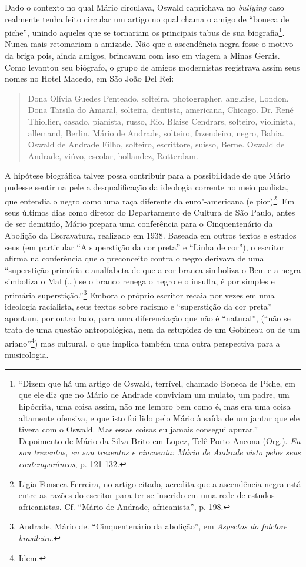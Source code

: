 Dado o contexto no qual Mário circulava, Oswald caprichava no
\emph{bullying} caso realmente tenha feito circular um artigo no qual
chama o amigo de ``boneca de piche'', unindo aqueles que se tornariam os
principais tabus de sua biografia\footnote{``Dizem que há um artigo de
  Oswald, terrível, chamado Boneca de Piche, em que ele diz que no Mário
  de Andrade conviviam um mulato, um padre, um hipócrita, uma coisa
  assim, não me lembro bem como é, mas era uma coisa altamente ofensiva,
  e que isto foi lido pelo Mário à saída de um jantar que ele tivera com
  o Oswald. Mas essas coisas eu jamais consegui apurar.'' Depoimento de
  Mário da Silva Brito em Lopez, Telê Porto Ancona (Org.). \emph{Eu sou
  trezentos, eu sou trezentos e cincoenta: Mário de Andrade visto pelos
  seus contemporâneos}, p. 121-132.}. Nunca mais retomariam a amizade.
Não que a ascendência negra fosse o motivo da briga pois, ainda amigos,
brincavam com isso em viagem a Minas Gerais. Como levantou seu biógrafo,
o grupo de amigos modernistas registrava assim seus nomes no Hotel
Macedo, em São João Del Rei:

\begin{quote}
Dona Olívia Guedes Penteado, solteira, photographer, anglaise, London.
Dona Tarsila do Amaral, solteira, dentista, americana, Chicago. Dr. René
Thiollier, casado, pianista, russo, Rio. Blaise Cendrars, solteiro,
violinista, allemand, Berlin. Mário de Andrade, solteiro, fazendeiro,
negro, Bahia. Oswald de Andrade Filho, solteiro, escrittore, suisso,
Berne. Oswald de Andrade, viúvo, escolar, hollandez, Rotterdam.
\end{quote}

A hipótese biográfica talvez possa contribuir para a possibilidade de
que Mário pudesse sentir na pele a desqualificação da ideologia corrente
no meio paulista, que entendia o negro como uma raça diferente da
euro"-americana (e pior)\footnote{Ligia Fonseca Ferreira, no artigo
  citado, acredita que a ascendência negra está entre as razões do
  escritor para ter se inserido em uma rede de estudos africanistas. Cf.
  ``Mário de Andrade, africanista'', p. 198.}. Em seus últimos dias como
diretor do Departamento de Cultura de São Paulo, antes de ser demitido,
Mário prepara uma conferência para o Cinquentenário da Abolição da
Escravatura, realizado em 1938. Baseada em outros textos e estudos seus
(em particular ``A superstição da cor preta'' e ``Linha de cor''), o
escritor afirma na conferência que o preconceito contra o negro derivava
de uma ``superstição primária e analfabeta de que a cor branca simboliza
o Bem e a negra simboliza o Mal (\ldots{}) se o branco renega o negro e o
insulta, é por simples e primária superstição.''\footnote{Andrade, Mário
  de. ``Cinquentenário da abolição'', em \emph{Aspectos do folclore
  brasileiro}.} Embora o próprio escritor recaia por vezes em uma
ideologia racialista, seus textos sobre racismo e ``superstição da cor
preta'' apontam, por outro lado, para uma diferenciação que não é
``natural'', (``não se trata de uma questão antropológica, nem da
estupidez de um Gobineau ou de um ariano''\footnote{Idem.}) mas
cultural, o que implica também uma outra perspectiva para a musicologia.

